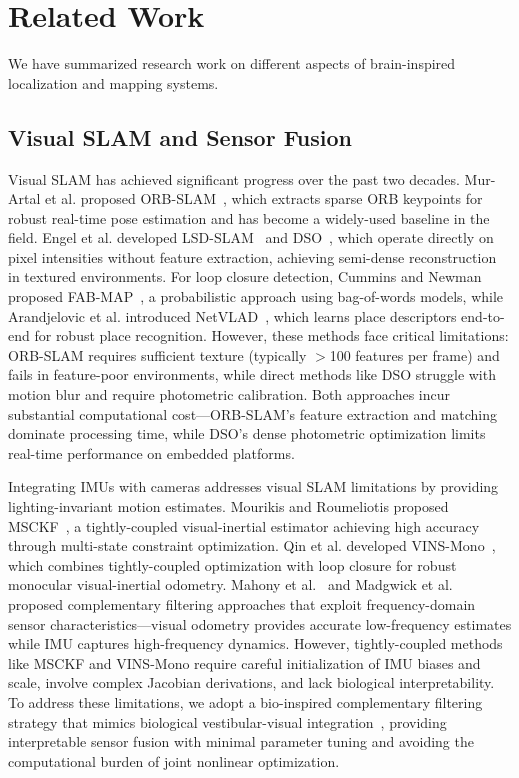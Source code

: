\section{Related Work}
\label{sec:related}

We have summarized research work on different aspects of brain-inspired localization and mapping systems.

\subsection{Visual SLAM and Sensor Fusion}
\label{sec:related_slam}

Visual SLAM has achieved significant progress over the past two decades. Mur-Artal et al. proposed ORB-SLAM~\cite{mur2015orb}, which extracts sparse ORB keypoints for robust real-time pose estimation and has become a widely-used baseline in the field. Engel et al. developed LSD-SLAM~\cite{engel2014lsd} and DSO~\cite{engel2018direct}, which operate directly on pixel intensities without feature extraction, achieving semi-dense reconstruction in textured environments. For loop closure detection, Cummins and Newman proposed FAB-MAP~\cite{Cummins2008}, a probabilistic approach using bag-of-words models, while Arandjelovic et al. introduced NetVLAD~\cite{Arandjelovic2016}, which learns place descriptors end-to-end for robust place recognition. However, these methods face critical limitations: ORB-SLAM requires sufficient texture (typically $>$100 features per frame) and fails in feature-poor environments, while direct methods like DSO struggle with motion blur and require photometric calibration. Both approaches incur substantial computational cost---ORB-SLAM's feature extraction and matching dominate processing time, while DSO's dense photometric optimization limits real-time performance on embedded platforms.

Integrating IMUs with cameras addresses visual SLAM limitations by providing lighting-invariant motion estimates. Mourikis and Roumeliotis proposed MSCKF~\cite{Mourikis2007}, a tightly-coupled visual-inertial estimator achieving high accuracy through multi-state constraint optimization. Qin et al. developed VINS-Mono~\cite{Qin2018}, which combines tightly-coupled optimization with loop closure for robust monocular visual-inertial odometry. Mahony et al.~\cite{Mahony2008} and Madgwick et al.~\cite{Madgwick2011} proposed complementary filtering approaches that exploit frequency-domain sensor characteristics---visual odometry provides accurate low-frequency estimates while IMU captures high-frequency dynamics. However, tightly-coupled methods like MSCKF and VINS-Mono require careful initialization of IMU biases and scale, involve complex Jacobian derivations, and lack biological interpretability. To address these limitations, we adopt a bio-inspired complementary filtering strategy that mimics biological vestibular-visual integration~\cite{Angelaki2004, Cullen2012}, providing interpretable sensor fusion with minimal parameter tuning and avoiding the computational burden of joint nonlinear optimization.

